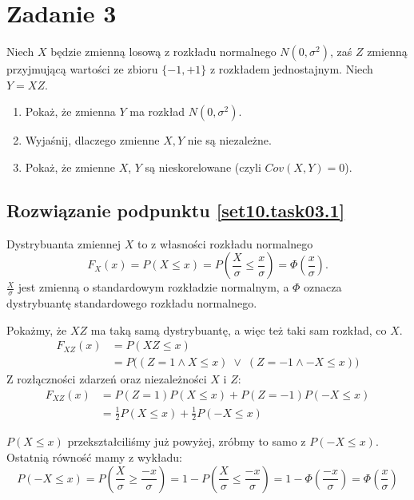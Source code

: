 \section{Zadanie 3}
Niech \(X\) będzie zmienną losową z rozkładu normalnego
\(N(0, \sigma^2)\), zaś \(Z\) zmienną przyjmującą wartości ze zbioru
\(\{-1, +1\}\) z rozkładem jednostajnym. Niech \(Y = XZ\).

\begin{enumerate}[label=(\roman*)]
	\item\label{set10.task03.1} Pokaż, że zmienna \(Y\) ma rozkład \(N(0, \sigma^2)\).
	\item\label{set10.task03.2} Wyjaśnij, dlaczego zmienne \(X, Y\) nie są niezależne.
	\item\label{set10.task03.3} Pokaż, że zmienne \(X\), \(Y\) są nieskorelowane (czyli \(Cov(X, Y) = 0\)).
\end{enumerate}

\subsection*{Rozwiązanie podpunktu \ref{set10.task03.1}}
Dystrybuanta zmiennej \(X\) to z własności rozkładu normalnego
\[
	F_X(x)
	= P(X \leq x)
	= P\left( \frac{X}{\sigma} \leq \frac{x}{\sigma} \right)
	= \Phi\left(\frac{x}{\sigma}\right).
\]
\(\frac{X}{\sigma}\) jest zmienną o standardowym rozkładzie normalnym,
a \(\Phi\) oznacza dystrybuantę standardowego rozkładu normalnego.

Pokażmy, że \(XZ\) ma taką samą dystrybuantę, a więc też taki sam rozkład, co \(X\).
\begin{align*}
	F_{XZ}(x)
	 & = P(XZ \leq x)                                                          \\
	 & = P\Big((Z = 1 \land X \leq x)\; \lor \; (Z = -1 \land -X \leq x) \Big)
\end{align*}
Z rozłączności zdarzeń oraz niezależności \(X\) i \(Z\):
\begin{align*}
	F_{XZ}(x)
	 & = P(Z = 1)P(X \leq x) + P(Z=-1)P(-X \leq x)          \\
	 & = \frac{1}{2} P(X \leq x) + \frac{1}{2} P(-X \leq x)
\end{align*}

\(P(X \leq x)\) przekształciliśmy już powyżej, zróbmy to samo z \(P(-X \leq x)\).
Ostatnią równość mamy z wykładu:
\[
	P(-X \leq x)
	= P\left( \frac{X}{\sigma} \geq \frac{-x}{\sigma} \right)
	= 1-P\left( \frac{X}{\sigma} \leq \frac{-x}{\sigma} \right)
	= 1 - \Phi\left( \frac{-x}{\sigma} \right)
	= \Phi\left( \frac{x}{\sigma} \right)
\]

